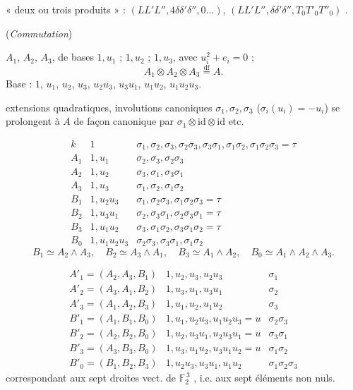 \documentclass[11pt,a4paper]{article}
\begin{document}
« deux ou trois produits » \ill{} : $(LL'L'', 4\delta\delta'\delta'', 0 \ldots)$, $(LL'L'', \delta\delta'\delta'', T_0T'_0T''_0)$ \ill{}.

(\emph{Commutation})


$A_1$, $A_2$, $A_3$, de bases $1, u_1$ ; $1, u_2$ ; $1, u_3$, avec $u_i^2 + e_i = 0$ ;
\[
  A_1 \otimes A_2 \otimes A_3 \overset{\mathrm{df}}{=} A .
\]
Base : $1$, $u_1$, $u_2$, $u_3$, $u_2u_3$, $u_3u_1$, $u_1u_2$, $u_1u_2u_3$.

extensions quadratiques, involutions canoniques $\sigma_1, \sigma_2, \sigma_3$ ($\sigma_i(u_i) = -u_i$) se prolongent à $A$ de façon canonique par $\sigma_1 \otimes \mathrm{id} \otimes \mathrm{id}$ etc.

\[
\begin{array}{lll}
  k & 1 & \sigma_1, \sigma_2, \sigma_3, \sigma_2\sigma_3, \sigma_3\sigma_1, \sigma_1\sigma_2, \sigma_1\sigma_2\sigma_3 = \tau \\
  A_1 & 1, u_1 & \sigma_2, \sigma_3, \sigma_2\sigma_3 \\
  A_2 & 1, u_2 & \sigma_3, \sigma_1, \sigma_3\sigma_1 \\
  A_3 & 1, u_3 & \sigma_1, \sigma_2, \sigma_1\sigma_2 \\
  B_1 & 1, u_2u_3 & \sigma_1, \sigma_2\sigma_3, \sigma_1\sigma_2\sigma_3 = \tau \\
  B_2 & 1, u_3u_1 & \sigma_2, \sigma_3\sigma_1, \sigma_2\sigma_3\sigma_1 = \tau \\
  B_3 & 1, u_1u_2 & \sigma_3, \sigma_1\sigma_2, \sigma_3\sigma_1\sigma_2 = \tau \\
  B_0 & 1, u_1u_2u_3 & \sigma_2\sigma_3, \sigma_3\sigma_1, \sigma_1\sigma_2
\end{array}
\]
\[
  B_1 \simeq A_2 \wedge A_3, \quad B_2 \simeq A_3 \wedge A_1, \quad B_3 \simeq A_1 \wedge A_2, \quad B_0 \simeq A_1 \wedge A_2 \wedge A_3 .
\]

\[
\begin{array}{lll}
  A'_1 = (A_2, A_3, B_1) & 1, u_2, u_3, u_2u_3 & \sigma_1 \\
  A'_2 = (A_3, A_1, B_2) & 1, u_3, u_1, u_3u_1 & \sigma_2 \\
  A'_3 = (A_1, A_2, B_3) & 1, u_1, u_2, u_1u_2 & \sigma_3 \\
  B'_1 = (A_1, B_1, B_0) & 1, u_1, u_2u_3, u_1u_2u_3 = u & \sigma_2\sigma_3 \\
  B'_2 = (A_2, B_2, B_0) & 1, u_2, u_3u_1, u_2u_3u_1 = u & \sigma_3\sigma_1 \\
  B'_3 = (A_3, B_3, B_0) & 1, u_3, u_1u_2, u_3u_1u_2 = u & \sigma_1\sigma_2 \\
  B'_0 = (B_1, B_2, B_3) & 1, u_2u_3, u_3u_1, u_1u_2 & \sigma_1\sigma_2\sigma_3
\end{array}
\]
correspondant aux sept droites vect. de $\mathbb{F}_2^{\,3}$ \struck{\ill{}}, i.e. aux  sept éléments non nuls.
\end{document}
